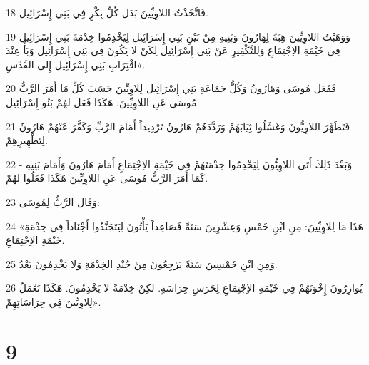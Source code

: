 \par 18 فَاتَّخَذْتُ اللاوِيِّينَ بَدَل كُلِّ بِكْرٍ فِي بَنِي إِسْرَائِيل.
\par 19 وَوَهَبْتُ اللاوِيِّينَ هِبَةً لِهَارُونَ وَبَنِيهِ مِنْ بَيْنِ بَنِي إِسْرَائِيل لِيَخْدِمُوا خِدْمَةَ بَنِي إِسْرَائِيل فِي خَيْمَةِ الاِجْتِمَاعِ وَلِلتَّكْفِيرِ عَنْ بَنِي إِسْرَائِيل لِكَيْ لا يَكُونَ فِي بَنِي إِسْرَائِيل وَبَأٌ عِنْدَ اقْتِرَابِ بَنِي إِسْرَائِيل إِلى القُدْسِ».
\par 20 فَفَعَل مُوسَى وَهَارُونُ وَكُلُّ جَمَاعَةِ بَنِي إِسْرَائِيل لِلاوِيِّينَ حَسَبَ كُلِّ مَا أَمَرَ الرَّبُّ مُوسَى عَنِ اللاوِيِّينَ. هَكَذَا فَعَل لهُمْ بَنُو إِسْرَائِيل.
\par 21 فَتَطَهَّرَ اللاوِيُّونَ وَغَسَّلُوا ثِيَابَهُمْ وَرَدَّدَهُمْ هَارُونُ تَرْدِيداً أَمَامَ الرَّبِّ وَكَفَّرَ عَنْهُمْ هَارُونُ لِتَطْهِيرِهِمْ.
\par 22 وَبَعْدَ ذَلِكَ أَتَى اللاوِيُّونَ لِيَخْدِمُوا خِدْمَتَهُمْ فِي خَيْمَةِ الاِجْتِمَاعِ أَمَامَ هَارُونَ وَأَمَامَ بَنِيهِ - كَمَا أَمَرَ الرَّبُّ مُوسَى عَنِ اللاوِيِّينَ هَكَذَا فَعَلُوا لهُمْ.
\par 23 وَقَال الرَّبُّ لِمُوسَى:
\par 24 «هَذَا مَا لِلاوِيِّينَ: مِنِ ابْنِ خَمْسٍ وَعِشْرِينَ سَنَةً فَصَاعِداً يَأْتُونَ لِيَتَجَنَّدُوا أَجْنَاداً فِي خِدْمَةِ خَيْمَةِ الاِجْتِمَاعِ.
\par 25 وَمِنِ ابْنِ خَمْسِينَ سَنَةً يَرْجِعُونَ مِنْ جُنْدِ الخِدْمَةِ وَلا يَخْدِمُونَ بَعْدُ.
\par 26 يُوازِرُونَ إِخْوَتَهُمْ فِي خَيْمَةِ الاِجْتِمَاعِ لِحَرَسِ حِرَاسَةٍ. لكِنْ خِدْمَةً لا يَخْدِمُونَ. هَكَذَا تَعْمَلُ لِلاوِيِّينَ فِي حِرَاسَاتِهِمْ».

\chapter{9}

